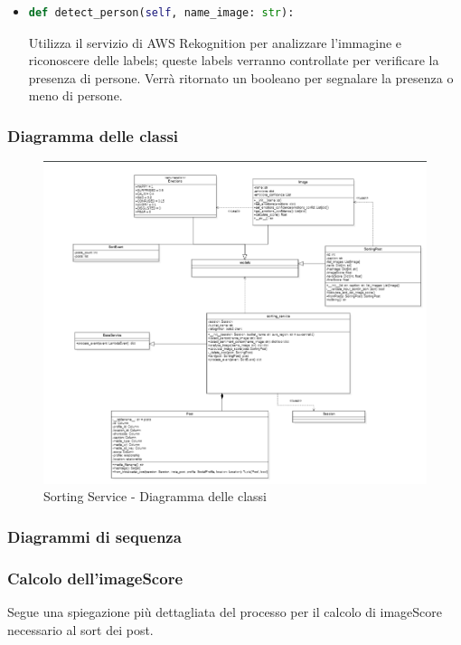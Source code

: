 \begin{itemize}
	\item
	\begin{lstlisting}[language=Python, numbers=none]	
def detect_person(self, name_image: str):
	\end{lstlisting}	
Utilizza il servizio di AWS Rekognition per analizzare l'immagine e riconoscere delle labels; queste labels verranno controllate per verificare la presenza di persone. Verrà ritornato un booleano per segnalare la presenza o meno di persone.
\end{itemize}
\newpage
\subsubsection{Diagramma delle classi}
\begin{figure}[!h]
    \includegraphics[width=15cm]{sezioni/images/cd_sorting.png}
    \caption{Sorting Service - Diagramma delle classi}
\end{figure}
\subsubsection{Diagrammi di sequenza}
\subsubsection{Calcolo dell'imageScore}
Segue una spiegazione più dettagliata del processo per il calcolo di imageScore necessario al sort dei post.
